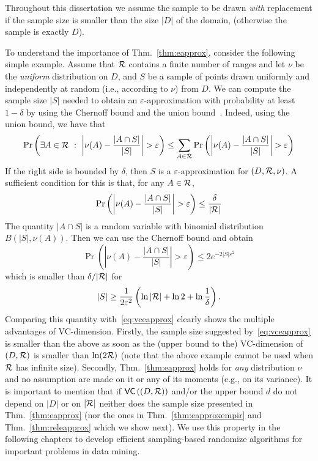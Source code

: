 Throughout this dissertation we assume the sample to be drawn \emph{with}
replacement if the sample size is smaller than the size $|D|$ of the domain,
(otherwise the sample is exactly $D$).  

To understand the importance of Thm.~\ref{thm:eapprox}, consider the following
simple example. Assume that $\mathcal{R}$ contains a finite number of ranges and let
$\nu$ be the \emph{uniform} distribution on $D$, and $S$ be a sample of
points drawn uniformly and independently at random (i.e., according to $\nu$)
from $D$. We can compute the sample size $|S|$ needed to obtain an
$\varepsilon$-approximation with probability at least $1-\delta$ by using the
Chernoff bound and the union
bound~\citep{MitzenmacherU05}. Indeed, using the union bound, we have that
\[
\Pr\left(\exists A\in\range ~:~ \left|\nu(A)-\frac{|A\cap
S|}{|S|}\right|>\varepsilon \right) \le \sum_{A\in\range}\Pr\left(\left|\nu(A)-\frac{|A\cap
S|}{|S|}\right|>\varepsilon\right)\]
If the right side is bounded by $\delta$, then $S$ is a
$\varepsilon$-approximation for $(D,\mathcal{R},\nu)$. A sufficient condition for
this is that, for any $A\in\mathcal{R}$,
\[
\Pr\left(\left|\nu(A)-\frac{|A\cap S|}{|S|}\right|>\varepsilon\right)\le
\frac{\delta}{|\range|}
\]
The quantity
$|A\cap S|$ is a random variable with binomial distribution $B(|S|, \nu(A))$.
Then we can use the Chernoff bound and obtain
\[
\Pr\left(\left|\nu(A)-\frac{|A\cap S|}{|S|}\right|>\varepsilon\right)\le 2e^{-2|S|\varepsilon^2}
\]
which is smaller than $\delta/|\mathcal{R}|$ for
\[
|S|\ge\frac{1}{2\varepsilon^2}\left(\ln|\mathcal{R}|+\ln 2 +\ln\frac{1}{\delta}\right).
\]
Comparing this quantity with~\eqref{eq:vceapprox} clearly shows the multiple
advantages of VC-dimension. Firstly, the sample size suggested
by~\eqref{eq:vceapprox} is smaller than the above as soon as the (upper bound to
the) VC-dimension of $(D,\mathcal{R})$ is smaller than $\ln(2\mathcal{R})$ (note that the
above example cannot be used when $\mathcal{R}$ has infinite size). Secondly,
Thm.~\ref{thm:eapprox} holds for \emph{any} distribution $\nu$ and no assumption
are made on it or any of its moments (e.g., on its variance). 
It is important to mention that if $\mathsf{VC}\left((D,\mathcal{R})\right)$ and/or the upper
bound $d$ do not depend on $|D|$ or on $|\mathcal{R}|$ neither does the sample size
presented in Thm.~\ref{thm:eapprox} (nor the ones in Thm.~\ref{thm:eapproxempir}
and Thm.~\ref{thm:releapprox} which we show next). We use this property in the
following chapters to develop efficient sampling-based randomize algorithms for
important problems in data mining.

